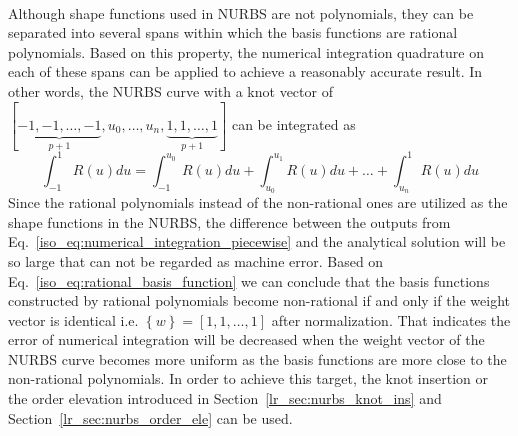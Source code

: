 \paragraph{}
Although shape functions used in NURBS are not polynomials, they can be separated into several spans within which the basis functions are rational polynomials.
Based on this property, the numerical integration quadrature on each of these spans can be applied to achieve a reasonably accurate result.
In other words, the NURBS curve with a knot vector of 
$[ 
    \underbrace{-1,-1,\dots,-1}_{p+1}, 
    u_0,\dots,u_n, 
    \underbrace{1,1,\dots,1 }_{p+1}
]$
can be integrated as
\begin{equation}
    \int_{-1}^{1} R(u) du = \int_{-1}^{u_0} R(u)du + 
                            \int_{u_0}^{u_1} R(u)du + \dots +
                            \int_{u_n}^1 R(u)du
\label{iso_eq:numerical_integration_piecewise}
\end{equation}
%
Since the rational polynomials instead of the non-rational ones are utilized as the shape functions in the NURBS, the difference between the outputs from Eq.~\ref{iso_eq:numerical_integration_piecewise} and the analytical solution will be so large that can not be regarded as machine error.
Based on Eq.~\ref{iso_eq:rational_basis_function} we can conclude that the basis functions constructed by rational polynomials become non-rational if and only if the weight vector is identical i.e. $\left\{ w \right\} = \left[ 1,1,\dots,1 \right]$ after normalization.
That indicates the error of numerical integration will be decreased when the weight vector of the NURBS curve becomes more uniform as the basis functions are more close to the non-rational polynomials.
In order to achieve this target, the knot insertion or the order elevation introduced in Section~\ref{lr_sec:nurbs_knot_ins} and Section~\ref{lr_sec:nurbs_order_ele} can be used.
\pagebreak
